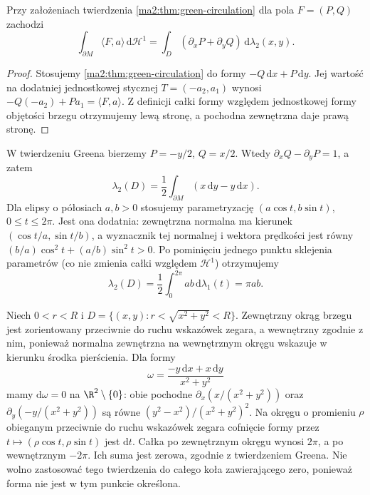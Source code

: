 \begin{wniosek}
\label{ma2:cor:green-flux}
Przy założeniach twierdzenia \ref{ma2:thm:green-circulation}
dla pola $F=(P,Q)$ zachodzi
\[
 \int_{\partial M}\langle F,a\rangle\,\mathrm d\mathcal H^1
 =\int_D(\partial_x P+\partial_y Q)
 \,\mathrm d\lambda_2(x,y).
\]
\end{wniosek}
\begin{proof}
Stosujemy \ref{ma2:thm:green-circulation}
do formy $-Q\,\mathrm dx+P\,\mathrm dy$.
Jej wartość na dodatniej jednostkowej stycznej
$T=(-a_2,a_1)$ wynosi
$-Q(-a_2)+Pa_1=\langle F,a\rangle$.
Z definicji całki formy względem jednostkowej
formy objętości brzegu otrzymujemy lewą stronę,
a pochodna zewnętrzna daje prawą stronę.
\end{proof}

\begin{przyklad}
\label{ma2:ex:green-area}
W twierdzeniu Greena bierzemy
$P=-y/2$, $Q=x/2$. Wtedy
$\partial_x Q-\partial_y P=1$, a zatem
\[
 \lambda_2(D)=\frac12\int_{\partial M}
 (x\,\mathrm dy-y\,\mathrm dx).
\]
Dla elipsy o półosiach $a,b>0$ stosujemy
parametryzację $(a\cos t,b\sin t)$,
$0\le t\le2\pi$. Jest ona dodatnia:
zewnętrzna normalna ma kierunek
$(\cos t/a,\sin t/b)$, a wyznacznik tej
normalnej i wektora prędkości jest równy
$(b/a)\cos^2t+(a/b)\sin^2t>0$.
Po pominięciu jednego punktu sklejenia parametrów
(co nie zmienia całki względem $\mathcal H^1$)
otrzymujemy
\[
 \lambda_2(D)=\frac12\int_0^{2\pi}ab\,\mathrm d\lambda_1(t)
 =\pi ab.
\]
\end{przyklad}

\begin{przyklad}
\label{ma2:ex:green-annulus}
Niech $0<r<R$ i $D=\{(x,y):r<\sqrt{x^2+y^2}<R\}$.
Zewnętrzny okrąg brzegu jest zorientowany
przeciwnie do ruchu wskazówek zegara,
a wewnętrzny zgodnie z nim, ponieważ normalna
zewnętrzna na wewnętrznym okręgu wskazuje
w kierunku środka pierścienia.
Dla formy
\[
 \omega=\frac{-y\,\mathrm dx+x\,\mathrm dy}{x^2+y^2}
\]
mamy $\mathrm d\omega=0$ na $\R^2\setminus\{0\}$:
obie pochodne $\partial_x(x/(x^2+y^2))$
oraz $\partial_y(-y/(x^2+y^2))$
są równe $(y^2-x^2)/(x^2+y^2)^2$.
Na okręgu o promieniu $\rho$ obieganym przeciwnie
do ruchu wskazówek zegara cofnięcie formy przez
$t\mapsto(\rho\cos t,\rho\sin t)$ jest $\mathrm dt$.
Całka po zewnętrznym okręgu wynosi $2\pi$,
a po wewnętrznym $-2\pi$.
Ich suma jest zerowa, zgodnie z twierdzeniem Greena.
Nie wolno zastosować tego twierdzenia do całego
koła zawierającego zero, ponieważ forma
nie jest w tym punkcie określona.
\end{przyklad}

